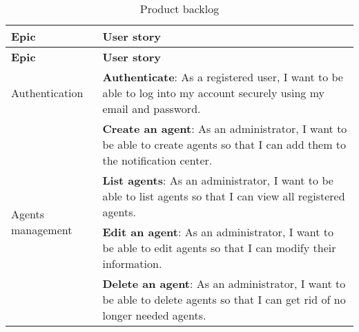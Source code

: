 \begin{longtable}{ | m{}  | m{} | }
      \caption{Product backlog}                                                                                                                                                                                                                              \\
      \hline
      \textbf{Epic}                                           & \textbf{User story}                                                                                                                                                                          \\
      \hline
      \endfirsthead
      \hline
      \textbf{Epic}                                           & \textbf{User story}                                                                                                                                                                          \\
      \hline
      \endhead
      \hline
      \endfoot
      \endlastfoot
      Authentication                                          & \textbf{Authenticate}: As a registered user, I want to be able to log into my account securely using my email and password.                                                                  \\
      \hline
      \multirow[t]{4}{5em}{Agents management}                 & \textbf{Create an agent}: As an administrator, I want to be able to create agents so that I can add them to the notification center.                                                         \\
      \cline{2-2}
                                                              & \textbf{List agents}: As an administrator, I want to be able to list agents so that I can view all registered agents.                                                                        \\
      \cline{2-2}
                                                              & \textbf{Edit an agent}: As an administrator, I want to be able to edit agents so that I can modify their information.                                                                        \\
      \cline{2-2}
                                                              & \textbf{Delete an agent}: As an administrator, I want to be able to delete agents so that I can get rid of no longer needed agents.                                                          \\

\end{longtable}

